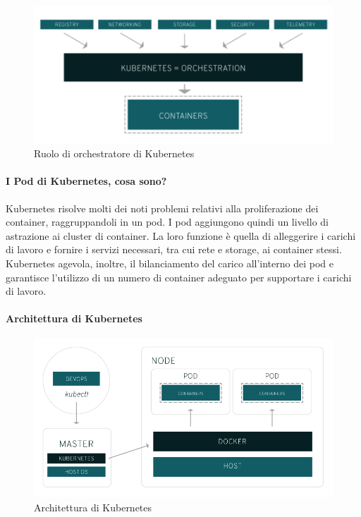 \begin{figure}[h!]
	\centering
	\includegraphics[width=\textwidth,keepaspectratio=true]{capitoli/imgs/kubernetes-diagram.png}
	\caption{Ruolo di orchestratore di Kubernetes}
\end{figure}

\paragraph{I Pod di Kubernetes, cosa sono?}
Kubernetes risolve molti dei noti problemi relativi alla proliferazione dei container, raggruppandoli in un pod. I pod aggiungono quindi un livello di astrazione ai cluster di container. La loro funzione è quella di alleggerire i carichi di lavoro e fornire i servizi necessari, tra cui rete e storage, ai container stessi. Kubernetes agevola, inoltre, il bilanciamento del carico all'interno dei pod e garantisce l'utilizzo di un numero di container adeguato per supportare i carichi di lavoro.

\paragraph{Architettura di Kubernetes}
\begin{figure}[h!]
	\centering
	\includegraphics[width=\textwidth,keepaspectratio=true]{capitoli/imgs/kubernetesarchitetcture.png}
	\caption{Architettura di Kubernetes}
\end{figure}

